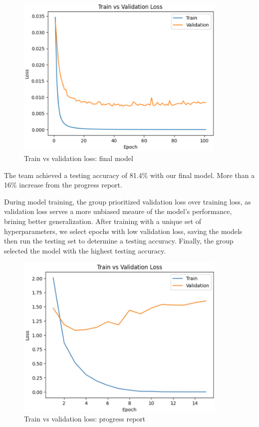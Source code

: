 \documentclass{article} %
\begin{document}
\FloatBarrier
\begin{figure}[h]
    \begin{center}
    \includegraphics[width=0.9\textwidth]{figures/trainValidationLoss_finalModel.png}
    \end{center}
    \caption{Train vs validation loss: final model}
    \label{fig:finalModelResult}
\end{figure}
\FloatBarrier

The team achieved a testing accuracy of 81.4\% with our final model. More than a 16\% increase from the progress report.

During model training, the group prioritized validation loss over training loss, as validation loss serves a more unbiased meaure of the model's performance, brining better generalization. After training with a unique set of hyperparameters, we select epochs with low validation loss, saving the models then run the testing set to determine a testing accuracy. Finally, the group selected the model with the highest testing accuracy.

\FloatBarrier
\begin{figure}[h]
    \begin{center}
    \includegraphics[width=0.9\textwidth]{figures/validationLossGraph.png}
    \end{center}
    \caption{Train vs validation loss: progress report}
    \label{fig:progressReportResult}
\end{figure}
\FloatBarrier
\end{document}

